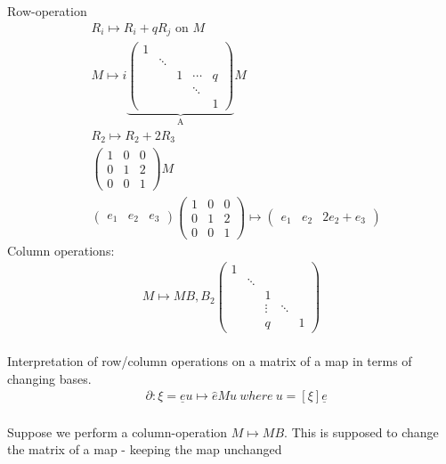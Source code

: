 \documentclass[11pt,a4paper]{report}
\begin{document}
              Row-operation
              \begin{align*}
                &R_i \mapsto R_i + qR_j \textrm{ on } M\\
                &M \mapsto i\underbrace{\begin{pmatrix}1&&&& \\ & \ddots &&& \\ && 1 & \cdots & q \\ &&& \ddots & \\ &&&& 1 \end{pmatrix}}_\text{A} M\\
                &R_2 \mapsto R_2 + 2R_3\\
                &\begin{pmatrix}1&0&0\\0&1&2\\0&0&1\end{pmatrix} M\\
                &\begin{pmatrix}e_1 & e_2 & e_3\end{pmatrix}\begin{pmatrix}1&0&0\\0&1&2\\0&0&1\end{pmatrix} \mapsto \begin{pmatrix}e_1 & e_2 & 2e_2 + e_3\end{pmatrix}
              \end{align*}
              Column operations:
              \begin{align*}
                M \mapsto MB, B_2\begin{pmatrix}1&&&& \\ & \ddots &&& \\ && 1 && \\ && \vdots & \ddots & \\ && q && 1 \end{pmatrix}
              \end{align*}
              \\
              Interpretation of row/column operations on a matrix of a map in terms of changing bases.
              \begin{align*}
                &\partial: \xi = \underline{e}u \mapsto \hat{e} M u
                \ where\ u = [\xi]\underline{e}
              \end{align*}
              \\
              Suppose we perform a column-operation $M \mapsto MB$. This is supposed to change the matrix of a map - keeping the map unchanged
\end{document}
